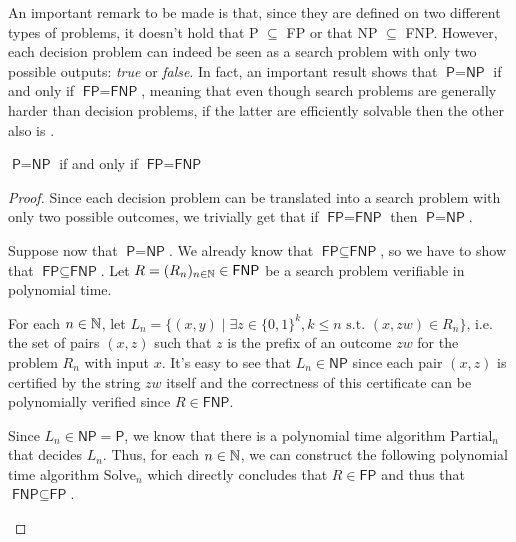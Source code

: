 An important remark to be made is that, since they are defined on two different types of problems, it doesn't hold that \textsf{P} $\subseteq$ \textsf{FP} or that \textsf{NP} $\subseteq$ \textsf{FNP}. However, each decision problem can indeed be seen as a search problem with only two possible outputs: \textit{true} or \textit{false}. In fact, an important result shows that $\textsf{P} = \textsf{NP} $ if and only if $\textsf{FP} = \textsf{FNP}$, meaning that even though search problems are generally harder than decision problems, if the latter are efficiently solvable then the other also is \cite{decision_vs_search, fp_vs_p}.

\begin{theorem}
    $\textsf{P} = \textsf{NP}$ if and only if $\textsf{FP} = \textsf{FNP}$
\end{theorem}

\begin{proof}
    Since each decision problem can be translated into a search problem with only two possible outcomes, we trivially get that if $\textsf{FP} = \textsf{FNP}$ then $\textsf{P} = \textsf{NP}$.
    
    Suppose now that $\textsf{P} = \textsf{NP}$. We already know that $\textsf{FP} \subseteq \textsf{FNP}$, so we have to show that $\textsf{FP} \subseteq \textsf{FNP}$. Let $R = (R_n)_{n \in \mathbb{N}} \in \textsf{FNP}$ be a search problem verifiable in polynomial time.
    
    For each $n \in \mathbb{N}$, let $L_n = \{(x,y) \mid \exists z \in \{0,1\}^{k}, k \leq n \text{ s.t. } (x,zw) \in R_n\}$, i.e. the set of pairs $(x,z)$ such that $z$ is the prefix of an outcome $zw$ for the problem $R_n$ with input $x$. It's easy to see that $L_n \in \textsf{NP}$ since each pair $(x,z)$ is certified by the string $zw$ itself and the correctness of this certificate can be polynomially verified since $R \in \textsf{FNP}$.
    
    Since $L_n \in \textsf{NP} = \textsf{P}$, we know that there is a polynomial time algorithm $\mathrm{Partial}_n$ that decides $L_n$. Thus, for each $n \in \mathbb{N}$, we can construct the following polynomial time algorithm $\mathrm{Solve}_n$ which directly concludes that $R \in \textsf{FP}$ and thus that $\textsf{FNP} \subseteq \textsf{FP}$.

    \newpage

    \begin{algorithmic}
                \Else
                \EndIf
            \EndWhile
        \EndFunction
    \end{algorithmic}
\end{proof}

